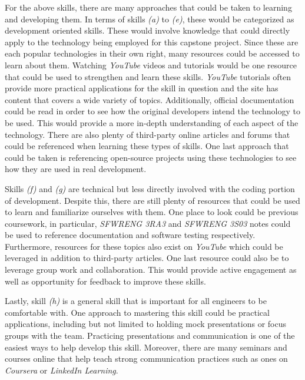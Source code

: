 \documentclass[12pt]{article}
\begin{document}
\begin{enumerate}
  For the above skills, there are many approaches that could be taken to learning
  and developing them. In terms of skills \textit{(a)} to \textit{(e)}, these would be categorized as
  development oriented skills. These would involve knowledge that could directly apply to
  the technology being employed for this capstone project. Since these are each popular
  technologies in their own right, many resources could be accessed to learn about them. Watching
  \textit{YouTube} videos and tutorials would be one resource that could be used to strengthen
  and learn these skills. \textit{YouTube} tutorials often provide more practical applications
  for the skill in question and the site has content that covers a wide variety of topics.
  Additionally, official documentation could be read in order to see how the original developers intend
  the technology to be used. This would provide a more in-depth understanding of each aspect of the
  technology. There are also plenty of third-party online articles and forums that could be referenced when
  learning these types of skills. One last approach that could be taken is referencing open-source
  projects using these technologies to see how they are used in real development.\par

  Skills \textit{(f)} and \textit{(g)} are technical but less directly involved with the coding portion
  of development. Despite this, there are still plenty of resources that could be used to learn and
  familiarize ourselves with them. One place to look could be previous coursework, in particular,
  \textit{SFWRENG 3RA3} and \textit{SFWRENG 3S03} notes could be used to reference documentation and
  software testing respectively. Furthermore, resources for these topics also exist on \textit{YouTube}
  which could be leveraged in addition to third-party articles. One last resource could also be to leverage
  group work and collaboration. This would provide active engagement as well as opportunity
  for feedback to improve these skills.\par

  Lastly, skill \textit{(h)} is a general skill that is important for all engineers to be comfortable
  with. One approach to mastering this skill could be practical applications, including but not limited to holding
  mock presentations or focus groups with the team. Practicing presentations and communication is one of the
  easiest ways to help develop this skill. Moreover, there are many seminars and courses online that help
  teach strong communication practices such as ones on \textit{Coursera} or \textit{LinkedIn Learning}.\par


\end{enumerate}
\end{document}
